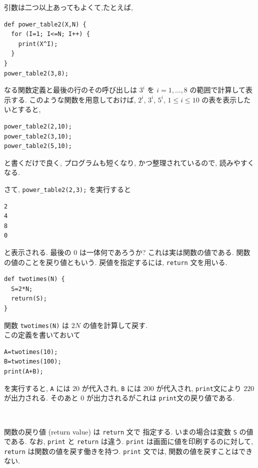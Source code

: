 \documentclass{jbook}
\begin{document}
引数は二つ以上あってもよくて,たとえば,
\begin{screen}
\begin{verbatim}
def power_table2(X,N) {
  for (I=1; I<=N; I++) {
    print(X^I);
  }
}
power_table2(3,8);
\end{verbatim}
\end{screen}
なる関数定義と最後の行のその呼び出しは 
$3^i$ を $i=1, \ldots, 8$ の範囲で計算して表示する.
このような関数を用意しておけば,
$2^i$, $3^i$, $5^i$, $1 \leq i \leq 10$ の表を表示したいとすると,
\begin{screen}
\begin{verbatim}
power_table2(2,10);
power_table2(3,10);
power_table2(5,10);
\end{verbatim}
\end{screen}
と書くだけで良く, プログラムも短くなり, かつ整理されているので, 読みやすくなる.

さて, {\tt power\_table2(2,3);} を実行すると
\begin{screen}
\begin{verbatim}
2
4
8
0
\end{verbatim}
\end{screen}
と表示される. 
最後の 0 は一体何であろうか?
これは実は関数の値である. 
関数の値のことを戻り値ともいう.
戻値を指定するには, {\tt return} 文を用いる.
\begin{flushleft}
\begin{minipage}[t]{7cm}
\begin{screen}
\begin{verbatim}
def twotimes(N) {
  S=2*N;
  return(S);
}
\end{verbatim}
\end{screen}
\end{minipage} \quad
%
\begin{minipage}[t]{7cm}
関数 {\tt twotimes(N)} は
$2N$ の値を計算して戻す. \\
この定義を書いておいて
\begin{verbatim}
A=twotimes(10);
B=twotimes(100);
print(A+B);
\end{verbatim}
を実行すると, {\tt A} には $20$ が代入され, {\tt B} には $200$ が代入され,
{\tt print}文により $220$ が出力される.
そのあと $0$ が出力されるがこれは {\tt print}文の戻り値である.
\end{minipage} \\
\end{flushleft}

\noindent  
関数の戻り値 (return value) は {\tt return} 文で
指定する.
いまの場合は変数 {\tt S} の値である.
なお, {\tt print} と {\tt return}  は違う.
{\tt print} は画面に値を印刷するのに対して,
{\tt return} は関数の値を戻す働きを持つ.
{\tt print} 文では, 関数の値を戻すことはできない.
\end{document}
